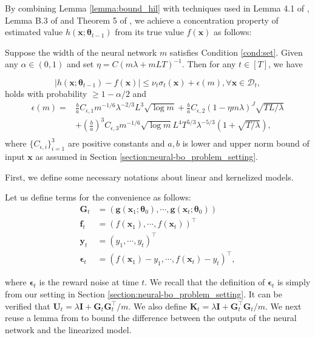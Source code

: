 By combining Lemma \ref{lemma:bound_hil} with techniques used in Lemma 4.1 of \citet{cao2019generalization}, Lemma B.3 
 of \citet{cao2019generalization} and Theorem 5 
of \citet{allen2019convergence}, we achieve a concentration property of estimated value $h(\mathbf{x}; \boldsymbol{\theta}_{t-1})$ from its true value $f(\mathbf{x})$ as follows:
\begin{lemma}
\label{lemma:predictive_bound}
Suppose the width of the neural network $m$ satisfies Condition \ref{cond:set}. Given any $\alpha \in (0,1)$ and set $\eta = C(m\lambda + mLT)^{-1}$.  Then for any $t \in [T]$, we have

\[\lvert h(\mathbf{x}; \boldsymbol{\theta}_{t-1}) - f(\mathbf{x}) \rvert \leq \nu_t \sigma_t(\mathbf{x}) + \epsilon(m), \forall \mathbf{x} \in \mathcal{D}_t, \] holds with probability $\geq  1-\alpha/2$ and 
\begin{equation*}
    \begin{split}
     \epsilon(m) = & \frac{b}{a} C_{\epsilon,1} m^{-1/6}\lambda^{-2/3}L^3 \sqrt{\log m} + \frac{b}{a} C_{\epsilon,2} (1-\eta m\lambda)^J \sqrt{TL/\lambda}\\
     & + \left(\frac{b}{a}\right)^3 C_{\epsilon,3} m^{-1/6} \sqrt{\log m} L^4 T^{5/3} \lambda^{-5/3} (1+\sqrt{T/\lambda}), \\
    \end{split}
\end{equation*}
where $\{C_{\epsilon,i}\}_{i=1}^3$ are positive constants and $a,b$ is lower and upper norm bound of input $\mathbf{x}$ as assumed in Section \ref{section:neural-bo_problem_setting}.
\end{lemma}
First, we define some necessary notations about linear and kernelized models.  
\begin{definition}
\label{def:linear_kernelized_terms}
Let us define terms for the convenience as follows:
\begin{equation*}
\begin{split}
\mathbf{G}_t & = (\mathbf{g}(\mathbf{x}_1; \boldsymbol{\theta}_0),\cdots,\mathbf{g}(\mathbf{x}_t; \boldsymbol{\theta}_0))\\
     \mathbf{f}_t & = (f(\mathbf{x}_1), \cdots, f(\mathbf{x}_t))^\top \\
     \mathbf{y}_t & = (y_1, \cdots, y_t)^\top \\
     \boldsymbol{\epsilon}_t & = (f(\mathbf{x}_1) - y_1, \cdots, f(\mathbf{x}_t) - y_t)^\top,
\end{split}
\end{equation*}
\end{definition}
where $\boldsymbol{\epsilon}_t$ is the reward noise at time $t$. We recall that the definition of $\boldsymbol{\epsilon}_t$ is simply from our setting in Section \ref{section:neural-bo_problem_setting}. It can be verified that $\mathbf{U}_t = \lambda\mathbf{I} + \mathbf{G}_t\mathbf{G}_t^\top/m$. 
We also define $\mathbf{K}_t = \lambda\mathbf{I} + \mathbf{G}_t ^\top\mathbf{G}_t /m$. 
We next reuse a lemma from \citet{zhang2021neural} to bound the difference between the outputs of the neural network and the linearized model.

